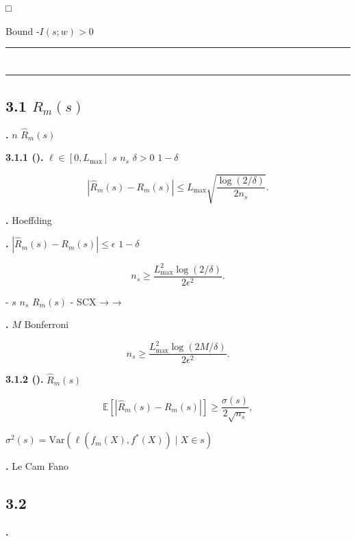 \documentclass[
  12pt,
]{article}
\begin{document}
□

 Bound
-\(I(s; w) > 0\)

\begin{center}\rule{0.5\linewidth}{0.5pt}\end{center}

\section{}\label{ux7b2cux4e09ux90e8ux5206ux7406ux8bbaux754cux9650ux5206ux6790}

\begin{center}\rule{0.5\linewidth}{0.5pt}\end{center}

\subsection{\texorpdfstring{3.1 \(R_m(s)\)
}{3.1 R\_m(s) }}\label{r_ms-ux7684ux6837ux672cux590dux6742ux5ea6}

\textbf{.}  \(n\) 
\(\hat{R}_m(s)\)

\textbf{ 3.1.1 ().} 
\(\ell \in [0, L_{\max}]\) \(s\)  \(n_s\) 
\(\delta > 0\) \(1 - \delta\)

\[|\hat{R}_m(s) - R_m(s)| \leq L_{\max} \sqrt{\frac{\log(2/\delta)}{2n_s}}.\]

\textbf{.}  Hoeffding 

\textbf{.}  \(|\hat{R}_m(s) - R_m(s)| \leq \epsilon\) 
\(1-\delta\) 

\[n_s \geq \frac{L_{\max}^2 \log(2/\delta)}{2\epsilon^2}.\]

 -  \(s\) \(n_s\) \(R_m(s)\)  -
SCX \textbf{} →
\textbf{} → 

\textbf{.}  \(M\)  Bonferroni


\[n_s \geq \frac{L_{\max}^2 \log(2M/\delta)}{2\epsilon^2}.\]

\textbf{ 3.1.2 ().} 
\(\hat{R}_m(s)\) 

\[\mathbb{E}[|\hat{R}_m(s) - R_m(s)|] \geq \frac{\sigma(s)}{2\sqrt{n_s}},\]

 \(\sigma^2(s) = \text{Var}(\ell(f_m(X), f^*(X)) \mid X \in s)\)

\textbf{.}  Le Cam  Fano 

\subsection{3.2
}\label{ux72b6ux6001ux53d1ux73b0ux7684ux76f8ux5408ux6027}

\textbf{.} 
\end{document}

